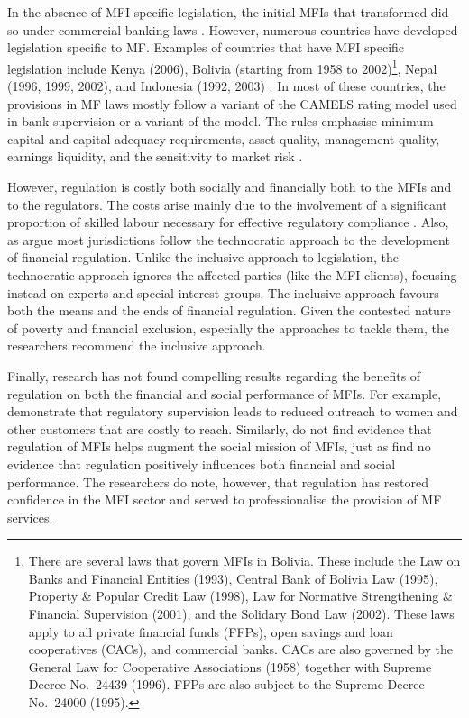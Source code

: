 \documentclass[a4paper, nobind]{templates/ociamthesis}
\begin{document}
In the absence of MFI specific legislation, the initial MFIs that transformed did so under commercial banking laws \autocite{campion1999institutional,siwale2017microfinance}. However, numerous countries have developed legislation specific to MF. Examples of countries that have MFI specific legislation include Kenya (2006), Bolivia (starting from 1958 to 2002)\footnote{There are several laws that govern MFIs in Bolivia. These include the Law on Banks and Financial Entities (1993), Central Bank of Bolivia Law (1995), Property \& Popular Credit Law (1998), Law for Normative Strengthening \& Financial Supervision (2001), and the Solidary Bond Law (2002). These laws apply to all private financial funds (FFPs), open savings and loan cooperatives (CACs), and commercial banks. CACs are also governed by the General Law for Cooperative Associations (1958) together with Supreme Decree No.~24439 (1996). FFPs are also subject to the Supreme Decree No.~24000 (1995).}, Nepal (1996, 1999, 2002), and Indonesia (1992, 2003) \autocite{meagher2006microfinance}. In most of these countries, the provisions in MF laws mostly follow a variant of the CAMELS rating model used in bank supervision or a variant of the model. The rules emphasise minimum capital and capital adequacy requirements, asset quality, management quality, earnings liquidity, and the sensitivity to market risk \autocite{daher2013microfinance}.

However, regulation is costly both socially and financially both to the MFIs and to the regulators. The costs arise mainly due to the involvement of a significant proportion of skilled labour necessary for effective regulatory compliance \autocite{cull2011does}. Also, as \textcite{marti2016financial} argue most jurisdictions follow the technocratic approach to the development of financial regulation. Unlike the inclusive approach to legislation, the technocratic approach ignores the affected parties (like the MFI clients), focusing instead on experts and special interest groups. The inclusive approach favours both the means and the ends of financial regulation. Given the contested nature of poverty and financial exclusion, especially the approaches to tackle them, the researchers recommend the inclusive approach.

Finally, research has not found compelling results regarding the benefits of regulation on both the financial and social performance of MFIs. For example, \textcite{cull2011does} demonstrate that regulatory supervision leads to reduced outreach to women and other customers that are costly to reach. Similarly, \textcite{siwale2017microfinance} do not find evidence that regulation of MFIs helps augment the social mission of MFIs, just as \textcite{hartarska2007regulated} find no evidence that regulation positively influences both financial and social performance. The researchers do note, however, that regulation has restored confidence in the MFI sector and served to professionalise the provision of MF services.
\end{document}
